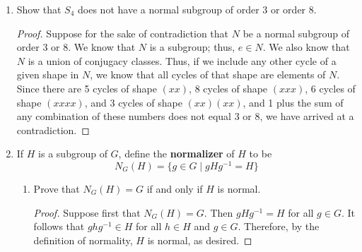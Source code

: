 \documentclass[../psets.tex]{subfiles}
\begin{document}
\begin{enumerate}
\begin{proof}


        Let $x\in H$ and $y\in K$ be arbitrary.\par
        Since $H$ is normal, $gxg^{-1}\in H$ for all $g\in G$. Choosing $g=y^{-1}$ reveals that $y^{-1}xy\in H$. Additionally, we know since $H$ is a subgroup that $x^{-1}\in H$. It similarly follows that $x^{-1}y^{-1}xy\in H$.\par
        Similarly, $x^{-1}y^{-1}x\in K$ and $y\in K$ imply that $x^{-1}y^{-1}xy\in K$.\par
        Having proven that $x^{-1}y^{-1}xy\in H$ and $x^{-1}y^{-1}xy\in K$, we know that $x^{-1}y^{-1}xy\in H\cap K=\{e\}$. Therefore,
        \begin{align*}
            x^{-1}y^{-1}xy &= e\\
            xy &= yx
        \end{align*}
        as desired.
    \end{proof}
    \item Show that $S_4$ does not have a normal subgroup of order 3 or order 8.
    \begin{proof}
        Suppose for the sake of contradiction that $N$ be a normal subgroup of order 3 or 8. We know that $N$ is a subgroup; thus, $e\in N$. We also know that $N$ is a union of conjugacy classes. Thus, if we include any other cycle of a given shape in $N$, we know that all cycles of that shape are elements of $N$. Since there are 5 cycles of shape $(xx)$, 8 cycles of shape $(xxx)$, 6 cycles of shape $(xxxx)$, and 3 cycles of shape $(xx)(xx)$, and 1 plus the sum of any combination of these numbers does not equal 3 or 8, we have arrived at a contradiction.
    \end{proof}
    \item If $H$ is a subgroup of $G$, define the \textbf{normalizer} of $H$ to be
    \begin{equation*}
        N_G(H) = \{g\in G\mid gHg^{-1}=H\}
    \end{equation*}
    \begin{enumerate}
        \item Prove that $N_G(H)=G$ if and only if $H$ is normal.
        \begin{proof}
            Suppose first that $N_G(H)=G$. Then $gHg^{-1}=H$ for all $g\in G$. It follows that $ghg^{-1}\in H$ for all $h\in H$ and $g\in G$. Therefore, by the definition of normality, $H$ is normal, as desired.\par

\end{proof}
\end{enumerate}
\end{enumerate}
\end{document}
